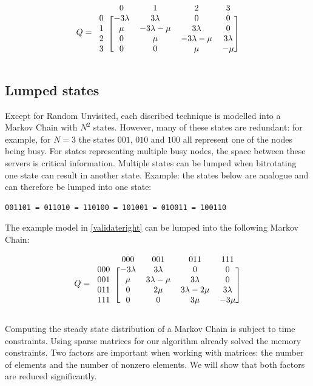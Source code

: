 \documentclass[10pt,a4paper]{article}
\begin{document}
\[ Q =
  \begin{blockarray}{ccccc}
    & 0 & 1 & 2 & 3 \\
    \begin{block}{c[cccc]}
    0 & -3\lambda & 3\lambda & 0 & 0 \\
    1 & \mu & -3\lambda-\mu & 3\lambda & 0 \\
    2 & 0 & \mu & -3\lambda-\mu & 3\lambda \\
    3 & 0 & 0 & \mu & -\mu \\
    \end{block}
  \end{blockarray}
\]

\subsection{Lumped states}
\label{lump}

Except for Random Unvisited, each discribed technique is modelled into a Markov Chain with $N^2$ states. However, many of these states are redundant: for example, for $N=3$ the states $001$, $010$ and $100$ all represent one of the nodes being busy. For states representing multiple busy nodes, the space between these servers is critical information. Multiple states can be lumped when bitrotating one state can result in another state. Example: the states below are analogue and can therefore be lumped into one state:
\begin{verbatim}
001101 = 011010 = 110100 = 101001 = 010011 = 100110
\end{verbatim}

The example model in \ref{validateright} can be lumped into the following Markov Chain:

\[ Q =
  \begin{blockarray}{ccccc}
    & 000 & 001 & 011 & 111 \\
    \begin{block}{c[cccc]}
    000 & -3\lambda & 3\lambda & 0 & 0 \\
    001 & \mu & 3\lambda-\mu & 3\lambda & 0 \\
    011 & 0 & 2\mu & 3\lambda-2\mu & 3\lambda \\
    111 & 0 & 0 & 3\mu & -3\mu \\
    \end{block}
  \end{blockarray}
\]

Computing the steady state distribution of a Markov Chain is subject to time constraints. Using sparse matrices for our algorithm already solved the memory constraints.
Two factors are important when working with matrices: the number of elements and the number of nonzero elements. We will show that both factors are reduced significantly.
\end{document}
